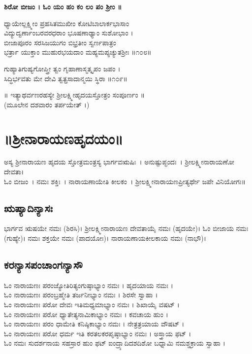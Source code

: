 {\bfseries ಶಿರೋ ಬೀಜಂ । ಓಂ ಯಂ ಹಂ ಕಂ ಲಂ ಪಂ ಶ್ರೀಂ ॥}

	ಧ್ಯಾಯೇಲ್ಲಕ್ಷ್ಮೀಂ ಪ್ರಹಸಿತಮುಖೀಂ ಕೋಟಿಬಾಲಾರ್ಕಭಾಸಾಂ\\
	ವಿದ್ಯುದ್ವರ್ಣಾಂಬರವರಧರಾಂ ಭೂಷಣಾಢ್ಯಾಂ ಸುಶೋಭಾಂ ।\\
ಬೀಜಾಪೂರಂ ಸರಸಿಜಯುಗಂ ಬಿಭ್ರತೀಂ ಸ್ವರ್ಣಪಾತ್ರಂ\\
ಭರ್ತ್ರಾ ಯುಕ್ತಾಂ ಮುಹುರಭಯದಾಂ ಮಹ್ಯಮಪ್ಯಚ್ಯುತಶ್ರೀಃ ॥೧೦೮॥

	ಗುಹ್ಯಾತಿಗುಹ್ಯಗೋಪ್ತ್ರೀ ತ್ವಂ ಗೃಹಾಣಾಸ್ಮತ್ಕೃಪಂ ಜಪಂ ।\\
	ಸಿದ್ಧಿರ್ಭವತು ಮೇ ದೇವಿ ತ್ವತ್ಪ್ರಸಾದಾನ್ಮಯಿ ಸ್ಥಿರಾ ॥೧೦೯॥

	॥ ಇತ್ಯಾಥರ್ವಣರಹಸ್ಯೇ ಶ್ರೀಲಕ್ಷ್ಮೀಹೃದಯಸ್ತೋತ್ರಂ ಸಂಪೂರ್ಣಂ ॥\\
	(ಮೂಲೇನ ದಶವಾರಂ ತರ್ಪಯೇತ್ ।)
\chapter*{\center ॥ಶ್ರೀನಾರಾಯಣಹೃದಯಂ॥}
ಅಸ್ಯ ಶ್ರೀನಾರಾಯಣ ಹೃದಯ ಸ್ತೋತ್ರಮಂತ್ರಸ್ಯ ಭಾರ್ಗವಋಷಿಃ~। ಅನುಷ್ಟುಪ್ಛಂದಃ~। ಶ್ರೀಲಕ್ಷ್ಮೀನಾರಾಯಣೋ ದೇವತಾ।\\
ಓಂ ಬೀಜಂ~। ನಮಃ ಶಕ್ತಿಃ~। ನಾರಾಯಣಾಯೇತಿ ಕೀಲಕಂ~। ಶ್ರೀಲಕ್ಷ್ಮೀನಾರಾಯಣಪ್ರೀತ್ಯರ್ಥೇ ಜಪೇ ವಿನಿಯೋಗಃ॥
\thispagestyle{empty}
\section{ಋಷ್ಯಾದಿನ್ಯಾಸಃ}
ಭಾರ್ಗವ ಋಷಯೇ ನಮಃ (ಶಿರಸಿ)। ಶ್ರೀಲಕ್ಷ್ಮೀನಾರಾಯಣ ದೇವತಾಯೈ ನಮಃ (ಹೃದಯೇ)। ಓಂ ಬೀಜಾಯ ನಮಃ (ಗುಹ್ಯೇ)। ನಮಃ ಶಕ್ತಯೇ ನಮಃ (ಪಾದಯೋಃ)। ನಾರಾಯಣಾಯಕೀಲಕಾಯ ನಮಃ (ನಾಭೌ)।\\

 \section{ಕರನ್ಯಾಸಪಂಚಾಂಗನ್ಯಾಸೌ}
ಓಂ ನಾರಾಯಣಃ ಪರಂಜ್ಯೋತಿರಿತ್ಯಂಗುಷ್ಠಾಭ್ಯಾಂ ನಮಃ । ಹೃದಯಾಯ ನಮಃ ।\\
ಓಂ ನಾರಾಯಣಃ ಪರಂಬ್ರಹ್ಮೇತಿ ತರ್ಜನೀಭ್ಯಾಂ ನಮಃ । ಶಿರಸೇ ಸ್ವಾಹಾ ।\\
ಓಂ ನಾರಾಯಣಃ ಪರೋ ದೇವಃ ಇತಿಮಧ್ಯಮಾಭ್ಯಾಂ ನಮಃ । ಶಿಖಾಯೈ ವಷಟ್ ।\\
ಓಂ ನಾರಾಯಣಃ ಪರೋ ಧ್ಯಾತೇತ್ಯನಾಮಿಕಾಭ್ಯಾಂ ನಮಃ । ಕವಚಾಯ ಹುಂ ।\\
ಓಂ ನಾರಾಯಣಃ ಪರಂ ಧಾಮೇತಿ ಕನಿಷ್ಠಿಕಾಭ್ಯಾಂ ನಮಃ । ನೇತ್ರತ್ರಯಾಯ ವೌಷಟ್ ।\\
ಓಂ ನಾರಾಯಣಃ ಪರೋ ಧರ್ಮ ಇತಿ ಕರತಲಕರಪೃಷ್ಠಾಭ್ಯಾಂ ನಮಃ । ಅಸ್ತ್ರಾಯ ಫಟ್ ।\\
ಓಂ ನಮಃ ಸುದರ್ಶನಾಯ ಸಹಸ್ರಾರ ಹುಂ ಫಟ್ ಐಂದ್ರ್ಯಾದಿದಶದಿಶೋ ಬಧ್ನಾಮಿ ನಮಶ್ಚಕ್ರಾಯ ಸ್ವಾಹಾ ।\\

